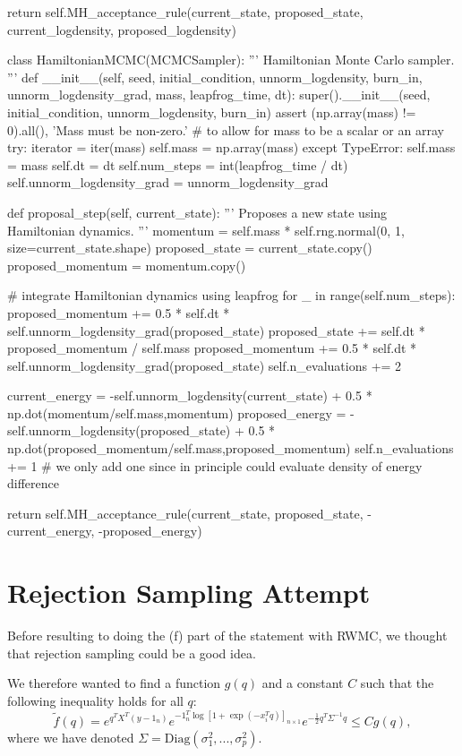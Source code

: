 \documentclass[a4paper, 12pt,oneside]{article}
\begin{document}
\begin{python}
				return self.MH_acceptance_rule(current_state, proposed_state, current_logdensity, proposed_logdensity)

		class HamiltonianMCMC(MCMCSampler):
			'''
			Hamiltonian Monte Carlo sampler.
			'''
			def __init__(self, seed, initial_condition, unnorm_logdensity, burn_in, unnorm_logdensity_grad, mass, leapfrog_time, dt):
				super().__init__(seed, initial_condition, unnorm_logdensity, burn_in)
				assert (np.array(mass) != 0).all(), 'Mass must be non-zero.'
				# to allow for mass to be a scalar or an array
				try:
					iterator = iter(mass)
					self.mass = np.array(mass)
				except TypeError:
					self.mass = mass
				self.dt = dt
				self.num_steps = int(leapfrog_time / dt)
				self.unnorm_logdensity_grad = unnorm_logdensity_grad
			
			def proposal_step(self, current_state):
				'''
				Proposes a new state using Hamiltonian dynamics.
				'''
				momentum = self.mass * self.rng.normal(0, 1, size=current_state.shape)
				proposed_state = current_state.copy()
				proposed_momentum = momentum.copy()
				
				# integrate Hamiltonian dynamics using leapfrog
				for _ in range(self.num_steps):
					proposed_momentum += 0.5 * self.dt * self.unnorm_logdensity_grad(proposed_state)
					proposed_state += self.dt * proposed_momentum / self.mass
					proposed_momentum += 0.5 * self.dt * self.unnorm_logdensity_grad(proposed_state)
					self.n_evaluations += 2

				current_energy = -self.unnorm_logdensity(current_state) + 0.5 * np.dot(momentum/self.mass,momentum)
				proposed_energy = -self.unnorm_logdensity(proposed_state) + 0.5 * np.dot(proposed_momentum/self.mass,proposed_momentum)
				self.n_evaluations += 1
				# we only add one since in principle could evaluate density of energy difference
				
				return self.MH_acceptance_rule(current_state, proposed_state, -current_energy, -proposed_energy)
		\end{python}
		\section{Rejection Sampling Attempt}\label{appendix:rejection-sampling-attempt}
		Before resulting to doing the (f) part of the statement with RWMC, we thought that rejection sampling could be a good idea. 
		
		We therefore wanted to find a function $g(q)$ and a constant $C$ such that the following inequality holds for all $q$:
		\begin{equation}
			\tilde{f}(q) = e^{q^TX^T(y-1_{n})}e^{-1_{n}^T \log[1+\exp(-x_i^Tq)]_{n\times 1}}e^{-\frac{1}{2}q^T\Sigma^{-1} q} \leq Cg(q),
		\end{equation}
		where we have denoted $\Sigma=\text{Diag}(\sigma_1^2,...,\sigma_p^2)$.
		
\end{document}
